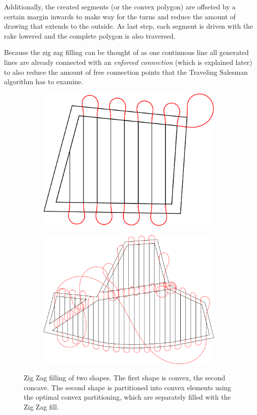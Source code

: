 Additionally, the created segments (or the convex polygon) are offseted by a certain margin inwards to make way for the turns and reduce the amount of drawing that extends to the outside. As last step, each segment is driven with the rake lowered and the complete polygon is also traversed.

Because the zig zag filling can be thought of as one continuous line all generated lines are already connected with an \textit{enforced connection} (which is explained later) to also reduce the amount of free connection points that the Traveling Salesman algorithm has to examine.
\begin{figure}
\centering
\begin{subfigure}[b]{0.6\textwidth}
\includegraphics[width=\textwidth]{images/path_planning/zigzag_1.pdf}
\end{subfigure}
\par\bigskip
\begin{subfigure}[b]{0.9\textwidth}
\includegraphics[width=\textwidth]{images/path_planning/zigzag_2.pdf}
\end{subfigure}
\caption{Zig Zag filling of two shapes. The first shape is convex, the second concave. The second shape is partitioned into convex elements using the optimal convex partitioning, which are separately filled with the Zig Zag fill.}
\end{figure}

